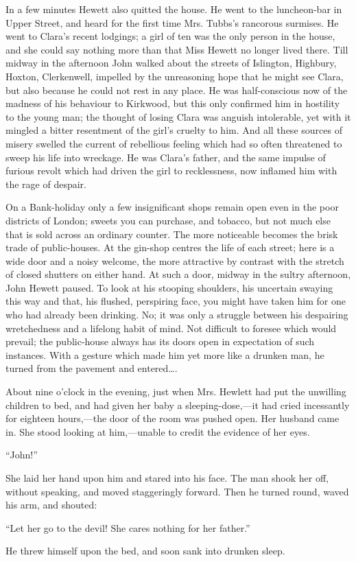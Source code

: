 In a few minutes Hewett also quitted the house. He went to the
luncheon-bar in Upper Street, and heard for the first time Mrs. Tubbs's
rancorous surmises. He went to Clara's recent lodgings; a girl of ten
was the only person in the house, and she could say nothing more than
that Miss Hewett no longer lived there. Till midway in the afternoon
John walked about the streets of Islington, Highbury, Hoxton,
Clerkenwell, impelled by the unreasoning hope that he might see Clara,
but also because he could not rest in any place. He was half-conscious
now of the madness of his behaviour to Kirkwood, but this only confirmed
him in hostility to the {\protect\hypertarget{289}{}{}}young man; the
thought of losing Clara was anguish intolerable, yet with it mingled a
bitter resentment of the girl's cruelty to him. And all these sources of
misery swelled the current of rebellious feeling which had so often
threatened to sweep his life into wreckage. He was Clara's father, and
the same impulse of furious revolt which had driven the girl to
recklessness, now inflamed him with the rage of despair.

On a Bank-holiday only a few insignificant shops remain open even in the
poor districts of London; sweets you can purchase, and tobacco, but not
much else that is sold across an ordinary counter. The more noticeable
becomes the brisk trade of public-houses. At the gin-shop centres the
life of each street; here is a wide door and a noisy welcome, the more
attractive by contrast with the stretch of closed shutters on either
hand. At such a door, midway in the sultry afternoon, John Hewett
paused. To look at his stooping shoulders, his uncertain swaying this
way and that, his flushed, perspiring face, you might
{\protect\hypertarget{290}{}{}}have taken him for one who had already
been drinking. No; it was only a struggle between his despairing
wretchedness and a lifelong habit of mind. Not difficult to foresee
which would prevail; the public-house always has its doors open in
expectation of such instances. With a gesture which made him yet more
like a drunken man, he turned from the pavement and entered\ldots{}.

About nine o'clock in the evening, just when Mrs. Hewlett had put the
unwilling children to bed, and had given her baby a sleeping-dose,---it
had cried incessantly for eighteen hours,---the door of the room was
pushed open. Her husband came in. She stood looking at him,---unable to
credit the evidence of her eyes.

``John!''

She laid her hand upon him and stared into his face. The man shook her
off, without speaking, and moved staggeringly forward. Then he turned
round, waved his arm, and shouted:

{\protect\hypertarget{291}{}{}}``Let her go to the devil! She cares
nothing for her father.''

He threw himself upon the bed, and soon sank into drunken sleep.
